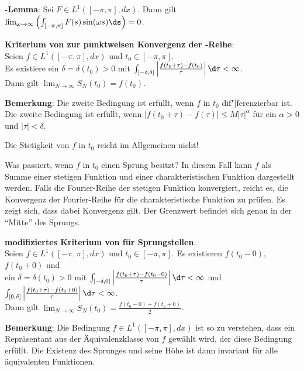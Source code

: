 \textbf{-Lemma}:
Sei $F \in L^1([-\pi, \pi], dx)$.
Dann gilt $\lim_{\omega \to \infty}
\left(\int_{[-\pi, \pi]} F(s) \sin(\omega s) \ds\right) = 0$.

\linie

\textbf{Kriterium von  zur punktweisen Konvergenz der
-Reihe}:\\
Seien $f \in L^1([-\pi, \pi], dx)$ und $t_0 \in [-\pi, \pi]$.\\
Es existiere ein $\delta = \delta(t_0) > 0$ mit
$\int_{[-\delta, \delta]}
\left|\frac{f(t_0 + \tau) - f(t_0)}{\tau}\right| \d\tau < \infty$.\\
Dann gilt $\lim_{N \to \infty} S_N(t_0) = f(t_0)$.

\textbf{Bemerkung}:
Die zweite Bedingung ist erfüllt, wenn $f$ in $t_0$ dif"|ferenzierbar ist.\\
Die zweite Bedingung ist erfüllt, wenn
$|f(t_0 + \tau) - f(\tau)| \le M |\tau|^\alpha$ für ein
$\alpha > 0$ und $|\tau| < \delta$.

Die Stetigkeit von $f$ in $t_0$ reicht im Allgemeinen nicht!

\linie

Was passiert, wenn $f$ in $t_0$ einen Sprung besitzt?
In diesem Fall kann $f$ als Summe einer stetigen Funktion und einer
charakteristischen Funktion dargestellt werden.
Falls die Fourier-Reihe der stetigen Funktion konvergiert, reicht es, die
Konvergenz der Fourier-Reihe für die charakteristische Funktion zu prüfen.
Es zeigt sich, dass dabei Konvergenz gilt.
Der Grenzwert befindet sich genau in der "`Mitte"' des Sprungs.

\textbf{modifiziertes Kriterium von  für Sprungstellen}:\\
Seien $f \in L^1([-\pi, \pi], dx)$ und $t_0 \in [-\pi, \pi]$.
Es existieren $f(t_0 - 0)$, $f(t_0 + 0)$ und\\
ein $\delta = \delta(t_0) > 0$ mit
$\int_{[-\delta, 0]}
\left|\frac{f(t_0 + \tau) - f(t_0 - 0)}{\tau}\right| \d\tau < \infty$ und
$\int_{[0, \delta]}
\left|\frac{f(t_0 + \tau) - f(t_0 + 0)}{\tau}\right| \d\tau < \infty$.\\
Dann gilt $\lim_{N \to \infty} S_N(t_0) = \frac{f(t_0 - 0) + f(t_0 + 0)}{2}$.

\textbf{Bemerkung}:
Die Bedingung $f \in L^1([-\pi, \pi], dx)$ ist so zu verstehen, dass
ein Repräsentant aus der Äquivalenzklasse von $f$ gewählt wird,
der diese Bedingung erfüllt.
Die Existenz des Sprunges und seine Höhe ist dann invariant für alle
äquivalenten Funktionen.

